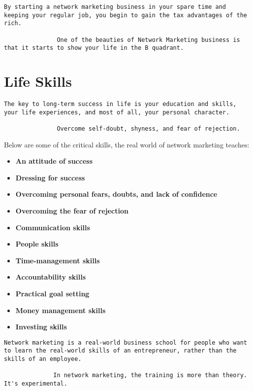\documentclass[a4paper, 12pt]{report}
\begin{document}
    \begin{lstlisting}[style=latexFrameTB]
               By starting a network marketing business in your spare time and keeping your regular job, you begin to gain the tax advantages of the rich. 
               
               One of the beauties of Network Marketing business is that it starts to show your life in the B quadrant.
    \end{lstlisting}
    
    \section{Life Skills}
    \begin{lstlisting}[style=latexFrameTB]
               The key to long-term success in life is your education and skills, your life experiences, and most of all, your personal character.
               
               Overcome self-doubt, shyness, and fear of rejection.
    \end{lstlisting}
    Below are some of the critical skills, the real world of network marketing teaches:
    \begin{itemize}
        \item \textbf{An attitude of success}
         \item \textbf{Dressing for success}
          \item \textbf{Overcoming personal fears, doubts, and lack of confidence}
           \item \textbf{Overcoming the fear of rejection}
            \item \textbf{Communication skills}
             \item \textbf{People skills}
              \item \textbf{Time-management skills}
               \item \textbf{Accountability skills}
                \item \textbf{Practical goal setting}
                 \item \textbf{Money management skills}
                  \item \textbf{Investing skills} 
        
        
    \end{itemize}
     \begin{lstlisting}[style=latexFrameTB]
              Network marketing is a real-world business school for people who want to learn the real-world skills of an entrepreneur, rather than the skills of an employee.
              
              In network marketing, the training is more than theory. It's experimental.
    \end{lstlisting}
    
\end{document}
